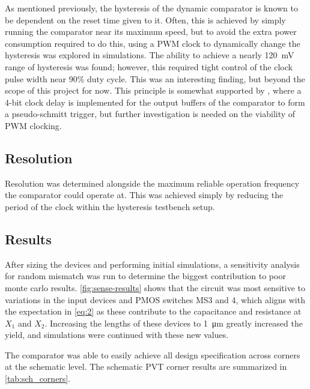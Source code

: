 \documentclass[11pt,letterpaper]{article}
\begin{document}
As mentioned previously, the hysteresis of the dynamic comparator is known to be dependent on the reset time given to it. Often, this is achieved by simply running the comparator near its maximum speed, but to avoid the extra power consumption required to do this, using a PWM clock to dynamically change the hysteresis was explored in simulations. The ability to achieve a nearly \qty{120}{\mV} range of hysteresis was found; however, this required tight control of the clock pulse width near 90\% duty cycle. This was an interesting finding, but beyond the scope of this project for now. This principle is somewhat supported by \cite{Khanfir2018,Khanfir2021}, where a 4-bit clock delay is implemented for the output buffers of the comparator to form a pseudo-schmitt trigger, but further investigation is needed on the viability of PWM clocking.  

\subsection{Resolution}

Resolution was determined alongside the maximum reliable operation frequency the comparator could operate at. This was achieved simply by reducing the period of the clock within the hysteresis testbench setup.

\subsection{Results}

After sizing the devices and performing initial simulations, a sensitivity analysis for random mismatch was run to determine the biggest contribution to poor monte carlo results. \cref{fig:sense-results} shows that the circuit was most sensitive to variations in the input devices and PMOS switches MS3 and 4, which aligns with the expectation in \cref{eq:2} as these contribute to the capacitance and resistance at \(X_1\) and \(X_2\). Increasing the lengths of these devices to \qty{1}{\um} greatly increased the yield, and simulations were continued with these new values.

The comparator was able to easily achieve all design specification across corners at the schematic level. The schematic PVT corner results are summarized in \cref{tab:sch_corners}.
\end{document}
